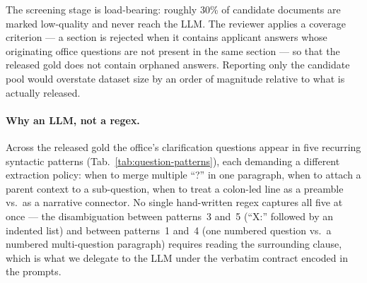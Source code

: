 The screening stage is load-bearing: roughly 30\% of candidate
documents are marked low-quality and never reach the LLM. The reviewer
applies a coverage criterion --- a section is rejected when it
contains applicant answers whose originating office questions are not
present in the same section --- so that the released gold does not
contain orphaned answers. Reporting only the candidate pool would
overstate dataset size by an order of magnitude relative to what is
actually released.

\paragraph{Why an LLM, not a regex.}
Across the released gold the office's clarification questions appear
in five recurring syntactic patterns
(Tab.~\ref{tab:question-patterns}), each demanding a different
extraction policy: when to merge multiple ``?'' in one paragraph,
when to attach a parent context to a sub-question, when to treat a
colon-led line as a preamble vs.\ as a narrative connector. No single
hand-written regex captures all five at once --- the disambiguation
between patterns~3 and~5 (``X:'' followed by an indented list) and
between patterns~1 and~4 (one numbered question vs.\ a numbered
multi-question paragraph) requires reading the surrounding clause,
which is what we delegate to the LLM under the verbatim contract
encoded in the prompts.

